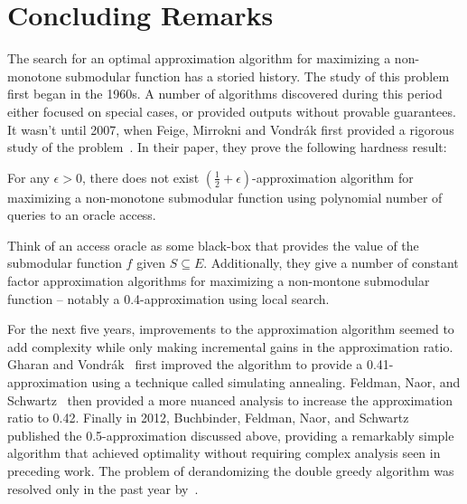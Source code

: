 \documentclass{article}
\begin{document}
\section{Concluding Remarks}\label{sec:conclusion}

The search for an optimal approximation algorithm for maximizing a non-monotone submodular function has a storied history. The study of this problem first began in the 1960s. A number of algorithms discovered during this period either focused on special cases, or provided outputs without provable guarantees. It wasn't until 2007, when Feige, Mirrokni and Vondr\'{a}k first provided a rigorous study of the problem~\cite{FMV07}. In their paper, they prove the following hardness result:
\begin{theorem}
For any $\epsilon > 0$, there does not exist $(\frac{1}{2} + \epsilon)$-approximation algorithm for maximizing a non-monotone submodular function using polynomial number of queries to an oracle access.
\end{theorem}

Think of an access oracle as some black-box that provides the value of the submodular function $f$ given $S \subseteq E$. Additionally, they give a number of constant factor approximation algorithms for maximizing a non-montone submodular function -- notably a 0.4-approximation using local search.

For the next five years, improvements to the approximation algorithm seemed to add complexity while only making incremental gains in the approximation ratio. Gharan and Vondr\'{a}k~\cite{GV11} first improved the algorithm to provide a 0.41-approximation using a technique called simulating annealing. Feldman, Naor, and Schwartz~\cite{FNS11} then provided a more nuanced analysis to increase the approximation ratio to 0.42. Finally in 2012, Buchbinder, Feldman, Naor, and Schwartz~\cite{BFSS15} published the 0.5-approximation discussed above, providing a remarkably simple algorithm that achieved optimality without requiring complex analysis seen in preceding work. The problem of derandomizing the double greedy algorithm was resolved only in the past year by~\cite{BF18}.
\end{document}
